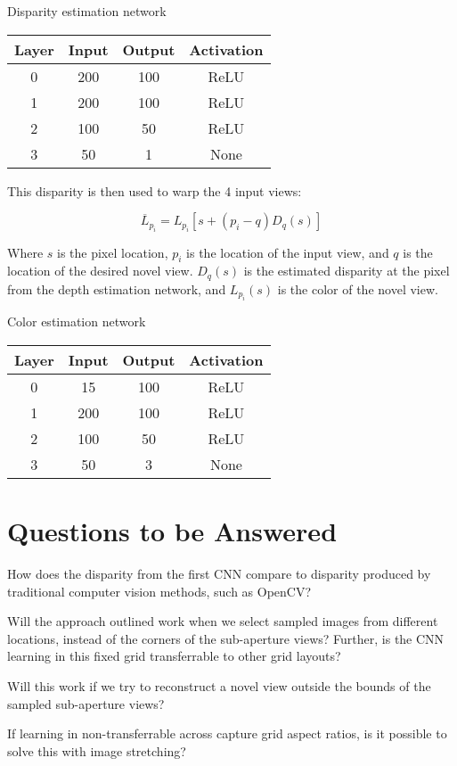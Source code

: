 \documentclass[10pt,twocolumn,letterpaper]{article}
\begin{document}
Disparity estimation network

\begin{center}
\begin{tabular}{|c c c c|}
    Layer & Input & Output & Activation \\
    \hline
    0 & 200 & 100 & ReLU \\
    1 & 200 & 100 & ReLU \\
    2 & 100 & 50 & ReLU \\
    3 & 50 & 1 & None \\
\end{tabular}
\end{center}


This disparity is then used to warp the 4 input views:

$$
\overline{L}_{p_i} = L_{p_i} \left[ s + \left(p_i - q\right) D_q(s) \right]
$$

Where $s$ is the pixel location, $p_i$ is the location of the input view, and $q$ is the location of the
desired novel view. $D_q(s)$ is the estimated disparity at the pixel from the depth estimation network,
and $L_{p_i}(s)$ is the color of the novel view. 

Color estimation network

\begin{center}
\begin{tabular}{|c c c c|}
    Layer & Input & Output & Activation \\ 
    \hline 
    0 & 15 & 100 & ReLU \\
    1 & 200 & 100 & ReLU \\
    2 & 100 & 50 & ReLU \\
    3 & 50 & 3 & None \\
\end{tabular}
\end{center}

\section{Questions to be Answered}

How does the disparity from the first CNN compare to disparity produced 
by traditional computer vision methods, such as OpenCV?

Will the approach outlined work when we select sampled images from different locations, instead 
of the corners of the sub-aperture views? Further, is the CNN learning in this fixed grid transferrable
to other grid layouts?

Will this work if we try to reconstruct a novel view outside the bounds of the sampled sub-aperture views?

If learning in non-transferrable across capture grid aspect ratios, is it possible to solve this with
image stretching?

{\small


}
\end{document}
